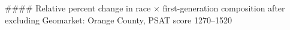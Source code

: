 #### Relative percent change in race × first-generation composition after excluding Geomarket: Orange County, PSAT score 1270–1520

